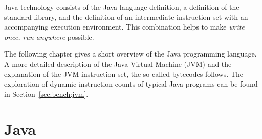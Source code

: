 Java technology consists of the Java language definition, a
definition of the standard library, and the definition of an
intermediate instruction set with an accompanying execution
environment. This combination helps to make \emph{write once, run
anywhere} possible.

The following chapter gives a short overview of the Java programming
language. A more detailed description of the Java Virtual Machine
(JVM) and the explanation of the JVM instruction set, the so-called
bytecodes follows. The exploration of dynamic instruction counts of
typical Java programs can be found in Section~\ref{sec:bench:jvm}.

\section{Java}

